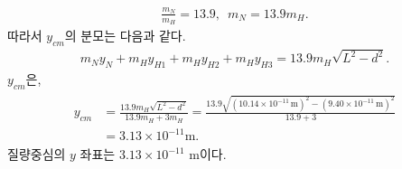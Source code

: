 \documentclass[floatfix,nofootinbib,superscriptaddress,fleqn]{revtex4-2}
\begin{document}
\begin{itemize}
  \begin{align}
    \frac{m_N}{m_H} = 13.9,\,\,\,m_{N}=13.9m_{H}.
  \end{align}
  따라서 $y_{cm}$의 분모는 다음과 같다.
  \begin{align}
    m_{N}y_{N} + m_{H}y_{H1} + m_{H}y_{H2} + m_{H}y_{H3}=
    13.9m_{H}\sqrt{L^2-d^2}.
  \end{align}
  $y_{cm}$은,
  \begin{align}
    \begin{split}
      y_{cm} &= \frac{13.9m_{H}\sqrt{L^2-d^2}}{13.9m_{H} + 3m_{H}}
      = \frac{13.9\sqrt{(10.14\times 10^{-11}\,\mathrm{m})^2
      -(9.40\times 10^{-11}\,\mathrm{m})^2}}{13.9 + 3}  \\
      &= 3.13\times10^{-11}\mathrm{m}.
    \end{split}
  \end{align}
  질량중심의 $y$ 좌표는 $3.13\times10^{-11}$ m이다.
\end{itemize}
\end{document}
